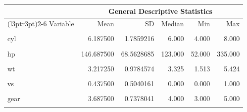 \begin{table}[!h]
\centering
\begin{tabular}{lrrrrr}
\toprule
\multicolumn{1}{c}{ } & \multicolumn{5}{c}{General Descriptive Statistics} \\
\cmidrule(l{3pt}r{3pt}){2-6}
Variable & Mean & SD & Median & Min & Max\\
\midrule
\cellcolor{gray!10}{mpg} & \cellcolor{gray!10}{20.090625} & \cellcolor{gray!10}{6.0269481} & \cellcolor{gray!10}{19.200} & \cellcolor{gray!10}{10.400} & \cellcolor{gray!10}{33.900}\\
cyl & 6.187500 & 1.7859216 & 6.000 & 4.000 & 8.000\\
\cellcolor{gray!10}{disp} & \cellcolor{gray!10}{230.721875} & \cellcolor{gray!10}{123.9386938} & \cellcolor{gray!10}{196.300} & \cellcolor{gray!10}{71.100} & \cellcolor{gray!10}{472.000}\\
hp & 146.687500 & 68.5628685 & 123.000 & 52.000 & 335.000\\
\cellcolor{gray!10}{drat} & \cellcolor{gray!10}{3.596563} & \cellcolor{gray!10}{0.5346787} & \cellcolor{gray!10}{3.695} & \cellcolor{gray!10}{2.760} & \cellcolor{gray!10}{4.930}\\
\addlinespace
wt & 3.217250 & 0.9784574 & 3.325 & 1.513 & 5.424\\
\cellcolor{gray!10}{qsec} & \cellcolor{gray!10}{17.848750} & \cellcolor{gray!10}{1.7869432} & \cellcolor{gray!10}{17.710} & \cellcolor{gray!10}{14.500} & \cellcolor{gray!10}{22.900}\\
vs & 0.437500 & 0.5040161 & 0.000 & 0.000 & 1.000\\
\cellcolor{gray!10}{am} & \cellcolor{gray!10}{0.406250} & \cellcolor{gray!10}{0.4989909} & \cellcolor{gray!10}{0.000} & \cellcolor{gray!10}{0.000} & \cellcolor{gray!10}{1.000}\\
gear & 3.687500 & 0.7378041 & 4.000 & 3.000 & 5.000\\
\addlinespace
\cellcolor{gray!10}{carb} & \cellcolor{gray!10}{2.812500} & \cellcolor{gray!10}{1.6152000} & \cellcolor{gray!10}{2.000} & \cellcolor{gray!10}{1.000} & \cellcolor{gray!10}{8.000}\\
\bottomrule
\end{tabular}
\end{table}
